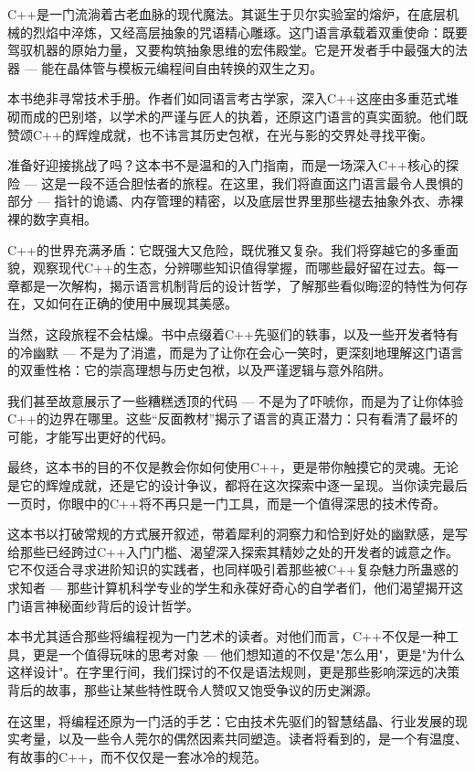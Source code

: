 C++是一门流淌着古老血脉的现代魔法。其诞生于贝尔实验室的熔炉，在底层机械的烈焰中淬炼，又经高层抽象的咒语精心雕琢。这门语言承载着双重使命：既要驾驭机器的原始力量，又要构筑抽象思维的宏伟殿堂。它是开发者手中最强大的法器 --- 能在晶体管与模板元编程间自由转换的双生之刃。

本书绝非寻常技术手册。作者们如同语言考古学家，深入C++这座由多重范式堆砌而成的巴别塔，以学术的严谨与匠人的执着，还原这门语言的真实面貌。他们既赞颂C++的辉煌成就，也不讳言其历史包袱，在光与影的交界处寻找平衡。

准备好迎接挑战了吗？这本书不是温和的入门指南，而是一场深入C++核心的探险 --- 这是一段不适合胆怯者的旅程。在这里，我们将直面这门语言最令人畏惧的部分 --- 指针的诡谲、内存管理的精密，以及底层世界里那些褪去抽象外衣、赤裸裸的数字真相。

C++的世界充满矛盾：它既强大又危险，既优雅又复杂。我们将穿越它的多重面貌，观察现代C++的生态，分辨哪些知识值得掌握，而哪些最好留在过去。每一章都是一次解构，揭示语言机制背后的设计哲学，了解那些看似晦涩的特性为何存在，又如何在正确的使用中展现其美感。

当然，这段旅程不会枯燥。书中点缀着C++先驱们的轶事，以及一些开发者特有的冷幽默 --- 不是为了消遣，而是为了让你在会心一笑时，更深刻地理解这门语言的双重性格：它的崇高理想与历史包袱，以及严谨逻辑与意外陷阱。

我们甚至故意展示了一些糟糕透顶的代码 --- 不是为了吓唬你，而是为了让你体验C++的边界在哪里。这些“反面教材”揭示了语言的真正潜力：只有看清了最坏的可能，才能写出更好的代码。

最终，这本书的目的不仅是教会你如何使用C++，更是带你触摸它的灵魂。无论是它的辉煌成就，还是它的设计争议，都将在这次探索中逐一呈现。当你读完最后一页时，你眼中的C++将不再只是一门工具，而是一个值得深思的技术传奇。


这本书以打破常规的方式展开叙述，带着犀利的洞察力和恰到好处的幽默感，是写给那些已经跨过C++入门门槛、渴望深入探索其精妙之处的开发者的诚意之作。它不仅适合寻求进阶知识的实践者，也同样吸引着那些被C++复杂魅力所蛊惑的求知者 --- 那些计算机科学专业的学生和永葆好奇心的自学者们，他们渴望揭开这门语言神秘面纱背后的设计哲学。

本书尤其适合那些将编程视为一门艺术的读者。对他们而言，C++不仅是一种工具，更是一个值得玩味的思考对象 --- 他们想知道的不仅是"怎么用"，更是"为什么这样设计"。在字里行间，我们探讨的不仅是语法规则，更是那些影响深远的决策背后的故事，那些让某些特性既令人赞叹又饱受争议的历史渊源。

在这里，将编程还原为一门活的手艺：它由技术先驱们的智慧结晶、行业发展的现实考量，以及一些令人莞尔的偶然因素共同塑造。读者将看到的，是一个有温度、有故事的C++，而不仅仅是一套冰冷的规范。

